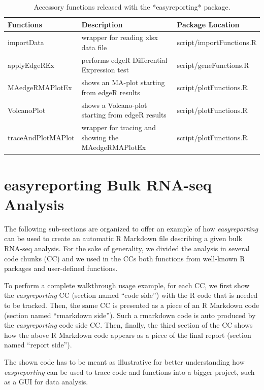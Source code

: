\documentclass[]{article}
\begin{document}
\begin{table}
\begin{tabular}{l|l|l}
\hline
\textbf{Functions} & \textbf{Description} & \textbf{Package Location} \\ \hline
importData & wrapper for reading xlsx data file & script/importFunctions.R \\
applyEdgeREx & performs edgeR Differential Expression test & script/geneFunctions.R \\ 
MAedgeRMAPlotEx & shows an MA-plot starting from edgeR results & script/plotFunctions.R \\ 
VolcanoPlot & shows a Volcano-plot starting from edgeR results & script/plotFunctions.R \\ 
traceAndPlotMAPlot & wrapper for tracing and showing the MAedgeRMAPlotEx & script/plotFunctions.R \\ \hline

\end{tabular}
\caption{Accessory functions released with the *easyreporting* package.}
\end{table}

\hypertarget{easyreporting-bulk-rna-seq-analysis}{%
\section{easyreporting Bulk RNA-seq
Analysis}\label{easyreporting-bulk-rna-seq-analysis}}

The following sub-sections are organized to offer an example of how
\emph{easyreporting} can be used to create an automatic R Markdown file
describing a given bulk RNA-seq analysis. For the sake of generality, we
divided the analysis in several code chunks (CC) and we used in the CCs
both functions from well-known R packages and user-defined functions.

To perform a complete walkthrough usage example, for each CC, we first
show the \emph{easyreporting} CC (section named ``code side'') with the
R code that is needed to be tracked. Then, the same CC is presented as a
piece of an R Markdown code (section named ``rmarkdown side''). Such a
rmarkdown code is auto produced by the \emph{easyreporting} code side
CC. Then, finally, the third section of the CC shows how the above R
Markdown code appears as a piece of the final report (section named
``report side'').

The shown code has to be meant as illustrative for better understanding
how \emph{easyreporting} can be used to trace code and functions into a
bigger project, such as a GUI for data analysis.
\end{document}
